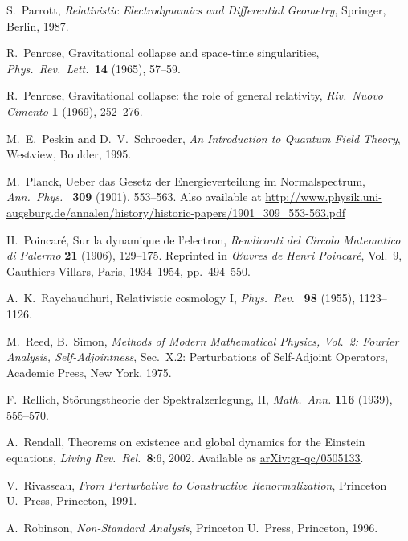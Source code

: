 \documentclass{article}
\begin{document}
\begin{thebibliography}{10}
 S.\ Parrott, \textsl{Relativistic Electrodynamics and Differential Geometry}, Springer, Berlin, 1987.

 R.\ Penrose, Gravitational collapse and space-time singularities, \textsl{Phys.\ Rev.\ Lett.\ }\textbf{14} (1965), 57--59.

  R.\ Penrose, Gravitational collapse: the role of general relativity, \textsl{Riv.\ Nuovo Cimento} \textbf{1} (1969), 252--276.

 M.\ E.\ Peskin and D.\ V.\ Schroeder, \textsl{An Introduction
to Quantum Field Theory}, Westview, Boulder, 1995.

 M.\ Planck, Ueber das Gesetz der Energieverteilung im Normalspectrum, \textsl{Ann.\ Phys.\ } \textbf{309} (1901), 553--563.  Also available at \href{http://www.physik.uni-augsburg.de/annalen/history/historic-papers/1901_309_553-563.pdf}{http://www.physik.uni-}       
 \href{http://www.physik.uni-augsburg.de/annalen/history/historic-papers/1901_309_553-563.pdf}{augsburg.de/annalen/history/historic-papers/1901\_309\_553-563.pdf}

 H.\ Poincar\'e, Sur la dynamique de l'electron, \textsl{Rendiconti del Circolo Matematico di Palermo} {\bf 21} (1906), 129--175.  Reprinted in \textsl{\OE uvres de Henri Poincar\'e}, Vol.\ 9, Gauthiers-Villars, Paris, 1934--1954, pp.\ 494--550.

 A.\ K.\ Raychaudhuri, Relativistic cosmology I, \textsl{Phys.\ Rev.\ } \textbf{98} (1955), 1123--1126.

 M.\ Reed, B.\ Simon, \textsl{Methods of Modern Mathematical Physics, Vol.\ 2: Fourier Analysis, Self-Adjointness}, Sec.\ X.2: Perturbations of Self-Adjoint Operators, Academic Press, New York, 1975.

 F.\ Rellich, St\"orungstheorie der Spektralzerlegung, II, \textit{Math.\ Ann.} {\bf 116} (1939), 555--570. 

 A.\ Rendall, Theorems on existence and global dynamics for the Einstein equations, \textsl{Living Rev.\ Rel.\ }\textbf{8}:6, 2002.  Available as \href{http://arxiv.org/abs/gr-qc/0505133}{arXiv:gr-qc/0505133}.

 V.\ Rivasseau, \textsl{From Perturbative to Constructive Renormalization}, Princeton U.\ Press, Princeton, 1991.

 A.\ Robinson, \textsl{Non-Standard Analysis}, Princeton U.\ Press, Princeton, 1996.


\end{thebibliography}
\end{document}
